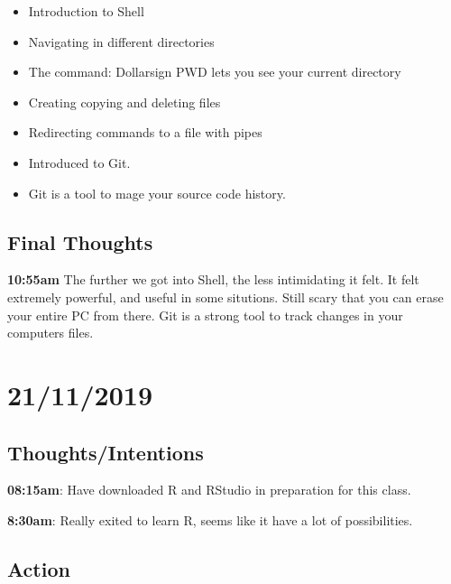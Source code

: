 \documentclass{article}
\begin{document}
\begin{itemize}
\item Introduction to Shell
\item Navigating in different directories
\item The command: Dollarsign PWD lets you see your current directory
\item Creating copying and deleting files
\item Redirecting commands to a file with pipes
\item Introduced to Git.
\item Git is a tool to mage your source code history.

\end{itemize}





\subsection{Final Thoughts}
\textbf{10:55am} The further we got into Shell, the less intimidating it felt. It felt extremely powerful, and useful in some situtions. Still scary that you can erase your entire PC from there. Git is a strong tool to track changes in your computers files.



\section{21/11/2019}
\subsection{Thoughts/Intentions}
\textbf{08:15am}:  Have downloaded R and RStudio in preparation for this class.


\textbf{8:30am}: Really exited to learn R, seems like it have a lot of possibilities.

\subsection{Action}
\end{document}
